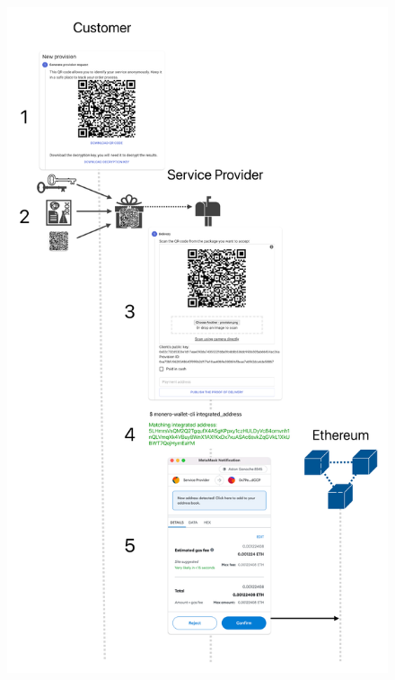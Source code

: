 \documentclass{ieeeaccess}
\begin{document}
\begin{figure}[ht]
  \begin{center}
  \includegraphics[width=\textwidth,height=\textheight,keepaspectratio]{experiment1.pdf}
  \end{center}
\end{figure}
\end{document}
